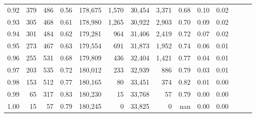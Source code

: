 \begin{tabular}{rrrrrrrrrrrrrr}
0.92 &    379 &  486 &  0.56 &  178,675 &    1,570 &  30,454 &   3,371 &  0.68 &  0.10 &      0.02 \\
0.93 &    305 &  468 &  0.61 &  178,980 &    1,265 &  30,922 &   2,903 &  0.70 &  0.09 &      0.02 \\
0.94 &    301 &  484 &  0.62 &  179,281 &      964 &  31,406 &   2,419 &  0.72 &  0.07 &      0.02 \\
0.95 &    273 &  467 &  0.63 &  179,554 &      691 &  31,873 &   1,952 &  0.74 &  0.06 &      0.01 \\
0.96 &    255 &  531 &  0.68 &  179,809 &      436 &  32,404 &   1,421 &  0.77 &  0.04 &      0.01 \\
0.97 &    203 &  535 &  0.72 &  180,012 &      233 &  32,939 &     886 &  0.79 &  0.03 &      0.01 \\
0.98 &    153 &  512 &  0.77 &  180,165 &       80 &  33,451 &     374 &  0.82 &  0.01 &      0.00 \\
0.99 &     65 &  317 &  0.83 &  180,230 &       15 &  33,768 &      57 &  0.79 &  0.00 &      0.00 \\
1.00 &     15 &   57 &  0.79 &  180,245 &        0 &  33,825 &       0 &   nan &  0.00 &      0.00 \\
\bottomrule
\end{tabular}

